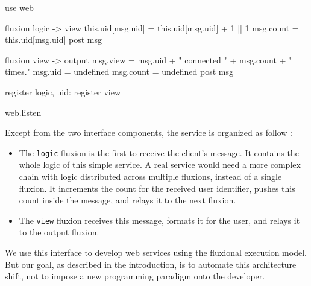 \begin{code}[Javascript, caption={Fluxional sample},label={lst:fluxional}]
use web

fluxion logic -> view
  this.uid[msg.uid] = this.uid[msg.uid] + 1 || 1
  msg.count = this.uid[msg.uid]
  post msg

fluxion view -> output
  msg.view = msg.uid + " connected " + msg.count + " times."
  msg.uid = undefined
  msg.count = undefined
  post msg

register logic, {uid: {}}
register view

web.listen
\end{code}

Except from the two interface components, the service is organized as follow :
\begin{itemize}
  \item The \texttt{logic} fluxion is the first to receive the client's message.
  It contains the whole logic of this simple service.
  A real service would need a more complex chain with logic distributed across multiple fluxions, instead of a single fluxion.
  It increments the count for the received user identifier, pushes this count inside the message, and relays it to the next fluxion.
  \item The \texttt{view} fluxion receives this message, formats it for the user, and relays it to the output fluxion.
\end{itemize}

We use this interface to develop web services using the fluxional execution model.
But our goal, as described in the introduction, is to automate this architecture shift, not to impose a new programming paradigm onto the developer.


